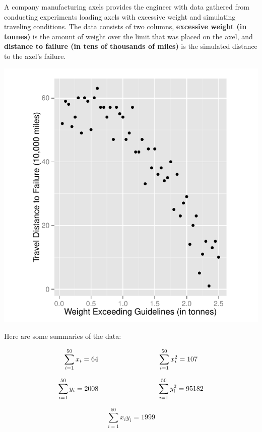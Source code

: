 \documentclass{examsetup}\usepackage[]{graphicx}\usepackage[]{color}
\newenvironment{knitrout}{}{} %
\begin{document}
\begin{questions}
A company manufacturing axels provides the engineer with data gathered from conducting experiments loading axels with excessive weight and simulating traveling conditions.
The data consists of two columns, \textbf{excessive weight (in tonnes)} is the amount of weight over the limit that was placed on the axel, and 
\textbf{distance to failure (in tens of thousands of miles)} is the simulated distance to the axel's failure. 



\begin{center}
\begin{knitrout}
\color{fgcolor}
\includegraphics[width=.5\linewidth]{figure/unnamed-chunk-12-1} 

\end{knitrout}
\end{center}

Here are some summaries of the data:

$$
\sum_{i=1}^{50} x_i = 64 \hspace{3cm} \sum_{i=1}^{50} x_i^2 = 107 \\
$$

$$
\sum_{i=1}^{50} y_i = 2008 \hspace{3cm} \sum_{i=1}^{50} y_i^2 = 95182 \\
$$

$$
\sum_{i=1}^{50} x_i y_i = 
1999
$$

\end{questions}
\end{document}

